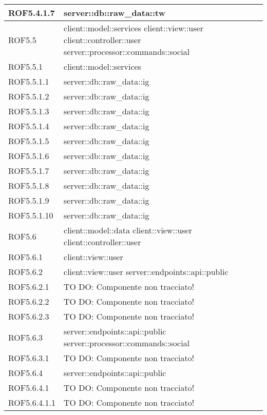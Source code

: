 \begin{center}
\begin{longtable}{| p{4cm} | p{8cm} |}
ROF5.4.1.7 & server::db::raw\_data::tw \\
\hline
ROF5.5 & client::model::services \newline client::view::user \newline client::controller::user \newline server::processor::commands::social \\
\hline
ROF5.5.1 & client::model::services \\
\hline
ROF5.5.1.1 & server::db::raw\_data::ig \\
\hline
ROF5.5.1.2 & server::db::raw\_data::ig \\
\hline
ROF5.5.1.3 & server::db::raw\_data::ig \\
\hline
ROF5.5.1.4 & server::db::raw\_data::ig \\
\hline
ROF5.5.1.5 & server::db::raw\_data::ig \\
\hline
ROF5.5.1.6 & server::db::raw\_data::ig \\
\hline
ROF5.5.1.7 & server::db::raw\_data::ig \\
\hline
ROF5.5.1.8 & server::db::raw\_data::ig \\
\hline
ROF5.5.1.9 & server::db::raw\_data::ig \\
\hline
ROF5.5.1.10 & server::db::raw\_data::ig \\
\hline
ROF5.6 & client::model::data \newline client::view::user \newline client::controller::user \\
\hline
ROF5.6.1 & client::view::user \\
\hline
ROF5.6.2 & client::view::user \newline server::endpoints::api::public \\
\hline
ROF5.6.2.1 & TO DO: Componente non tracciato! \\
\hline
ROF5.6.2.2 & TO DO: Componente non tracciato! \\
\hline
ROF5.6.2.3 & TO DO: Componente non tracciato! \\
\hline
ROF5.6.3 & server::endpoints::api::public \newline server::processor::commands::social \\
\hline
ROF5.6.3.1 & TO DO: Componente non tracciato! \\
\hline
ROF5.6.4 & server::endpoints::api::public \\
\hline
ROF5.6.4.1 & TO DO: Componente non tracciato! \\
\hline
ROF5.6.4.1.1 & TO DO: Componente non tracciato! \\

\end{longtable}
\end{center}
